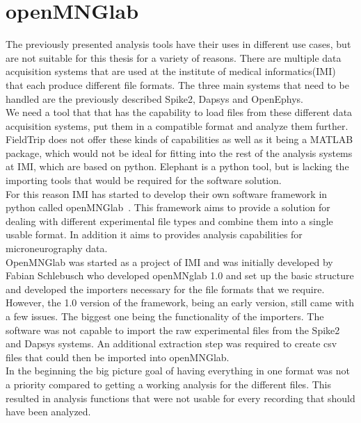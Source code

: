 \section{openMNGlab}
The previously presented analysis tools have their uses in different use cases, but are not suitable for this thesis for a variety of reasons.
There are multiple data acquisition systems that are used at the institute of medical informatics(IMI) that each produce different file formats. The three main systems that need to be handled are the previously described Spike2, Dapsys and OpenEphys. \\ 
We need a tool that that has the capability to load files from these different data acquisition systems, put them in a compatible format and analyze them further.  FieldTrip does not offer these kinds of capabilities as well as it being a MATLAB package, which would not be ideal for fitting into the rest of the analysis systems at IMI, which are based on python. Elephant is a python tool, but is lacking the importing tools that would be required for the software solution.  \\
For this reason IMI has started to develop their own software framework in python called openMNGlab~\cite{schlebusch_openmnglab_2021}.  This framework aims to provide a solution for dealing with different experimental file types and combine them into a single usable format.  In addition it aims to provides analysis capabilities for microneurography data. \\
OpenMNGlab was started as a project of IMI and was initially developed by Fabian Schlebusch who developed openMNglab 1.0 and set up the basic structure and developed the importers necessary for the file formats that we require. \\
However, the 1.0 version of the framework, being an early version,  still came with a few issues. The biggest one being the functionality of the importers. The software was not capable to import the raw experimental files from the Spike2 and Dapsys systems. An additional extraction step was required to create csv files that could then be imported into openMNGlab. \\
In the beginning the big picture goal of having everything in one format was not a priority compared to getting a working analysis for the different files. This resulted in analysis functions that were not usable for every recording that should have been analyzed.\\

